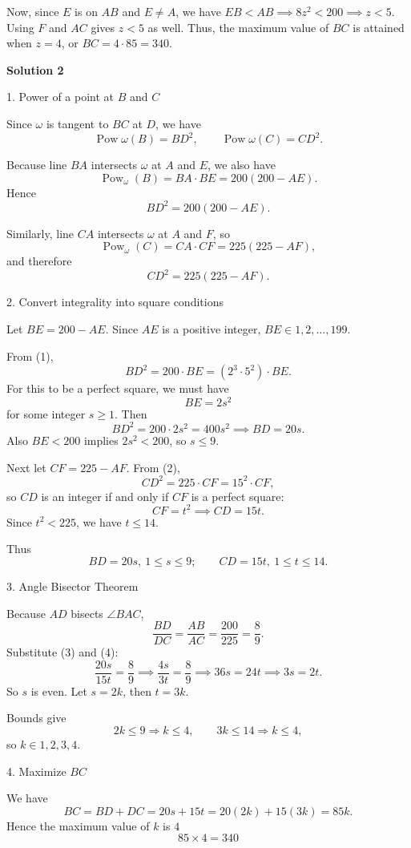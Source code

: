 \begin{enumerate}
 Now, since $E$ is on $AB$ and $E\neq A$, we have $EB < AB\implies 8z^2< 200 \implies z < 5$. Using $F$ and $AC$ gives $z< 5$ as well. Thus, the maximum value of $BC$ is attained when $z=4$, or $BC = 4\cdot 85 = \boxed{340}$.

 



\textbf{Solution 2}

1. Power of a point at $B$ and $C$

 Since $\omega$ is tangent to $BC$ at $D$, we have
 \[\operatorname{Pow}\omega(B)=BD^2,\qquad \operatorname{Pow}\omega(C)=CD^2.\]

 Because line $BA$ intersects $\omega$ at $A$ and $E$, we also have
 \[\operatorname{Pow}_\omega(B)=BA\cdot BE=200(200-AE).\]Hence
 \[BD^2=200(200-AE). \tag{1}\]

 Similarly, line $CA$ intersects $\omega$ at $A$ and $F$, so
 \[\operatorname{Pow}_\omega(C)=CA\cdot CF=225(225-AF),\]and therefore
 \[CD^2=225(225-AF). \tag{2}\]

 
2. Convert integrality into square conditions

 Let $BE=200-AE$. Since $AE$ is a positive integer, $BE\in{1,2,\dots,199}$.

 From (1),
 \[BD^2=200\cdot BE = (2^3\cdot 5^2)\cdot BE.\]For this to be a perfect square, we must have
 \[BE=2s^2\]for some integer $s\ge 1$. Then
 \[BD^2=200\cdot 2s^2=400s^2 \implies BD=20s. \tag{3}\]Also $BE<200$ implies $2s^2<200$, so $s\le 9$.

 Next let $CF=225-AF$. From (2),
 \[CD^2=225\cdot CF=15^2\cdot CF,\]so $CD$ is an integer if and only if $CF$ is a perfect square:
 \[CF=t^2 \implies CD=15t. \tag{4}\]Since $t^2<225$, we have $t\le 14$.

 Thus
 \[BD=20s,\ 1\le s\le 9;\qquad CD=15t,\ 1\le t\le 14.\]

 
3. Angle Bisector Theorem

 Because $AD$ bisects $\angle BAC$,
 \[\frac{BD}{DC}=\frac{AB}{AC}=\frac{200}{225}=\frac{8}{9}.\]Substitute (3) and (4):
 \[\frac{20s}{15t}=\frac{8}{9} \implies \frac{4s}{3t}=\frac{8}{9} \implies 36s=24t \implies 3s=2t.\]So $s$ is even. Let $s=2k$, then $t=3k$.

 Bounds give
 \[2k\le 9 \Rightarrow k\le 4,\qquad 3k\le 14 \Rightarrow k\le 4,\]so $k\in{1,2,3,4}$.

 
4. Maximize $BC$

 We have
 \[BC=BD+DC=20s+15t=20(2k)+15(3k)=85k.\]Hence the maximum value of $k$ is $4$
 \[85 \times 4=340\]


\end{enumerate}
